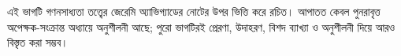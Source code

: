 \documentclass[../../include/open-logic-part]{subfiles}
\begin{document}

\begin{editorial}
  এই ভাগটি গণনসাধ্যতা তত্ত্বের জেরেমি অ্যাভিগ্যাডের নোটের উপর
  ভিত্তি করে রচিত। আপাতত কেবল পুনরাবৃত্ত অপেক্ষক-সংক্রান্ত অধ্যায়ে
  অনুশীলনী আছে; পুরো ভাগটিরই প্রেরণা, উদাহরণ, বিশদ ব্যাখ্যা ও অনুশীলনী
  দিয়ে আরও বিস্তৃত করা সম্ভব।
\end{editorial}



\OLEndPartHook
\end{document}
